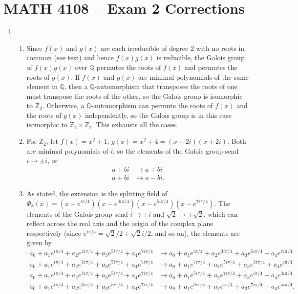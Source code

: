 \documentclass[12pt]{article}
\begin{document}
\section*{MATH 4108 -- Exam 2 Corrections}
\begin{enumerate}
    \item
        \begin{enumerate}
            \item
                Since $f(x)$ and $g(x)$ are each irreducible of degree 2 with no roots in common (see test) and hence $f(x) g(x)$ is reducible, the Galois group of $f(x) g(x)$ over $\mathbb{Q}$ permutes the roots of $f(x)$ and permutes the roots of $g(x)$. If $f(x)$ and $g(x)$ are minimal polynomials of the same element in $\mathbb{Q}$, then a $\mathbb{Q}$-automorphism that transposes the roots of one must transpose the roots of the other, so the Galois group is isomorphic to $\mathbb{Z}_2$. Otherwise, a $\mathbb{Q}$-automorphism can permute the roots of $f(x)$ and the roots of $g(x)$ independently, so the Galois group is in this case isomorphic to $\mathbb{Z}_2 \times \mathbb{Z}_2$. This exhausts all the cases.
            \item
                For $\mathbb{Z}_2$, let $f(x) = x^2 + 1$, $g(x) = x^2 + 4 = (x - 2i)(x + 2i)$. Both are minimal polynomials of $i$, so the elements of the Galois group send $i \to \pm i$, or
                \begin{align*}
                    a + bi &\mapsto a + bi \\
                    a + bi &\mapsto a - bi.
                \end{align*}
            \item
                As stated, the extension is the splitting field of $\Phi_8(x) = (x - e^{i\pi/4})(x - e^{3i\pi/4})(x - e^{5i\pi/4})(x - e^{7i\pi/4})$. The elements of the Galois group send $i \to \pm i$ and $\sqrt{2} \to \pm \sqrt{2}$, which can reflect across the real axis and the origin of the complex plane respectively (since $e^{i\pi/4} = \sqrt{2}/2 + \sqrt{2}i/2$, and so on), the elements are given by
                \begin{align*}
                    a_0 + a_1e^{i\pi/4} + a_2e^{3i\pi/4} + a_3e^{5i\pi/4} + a_4e^{7i\pi/4} &\mapsto a_0 + a_1e^{i\pi/4} + a_2e^{3i\pi/4} + a_3e^{5i\pi/4} + a_4e^{7i\pi/4} \\
                    a_0 + a_1e^{i\pi/4} + a_2e^{3i\pi/4} + a_3e^{5i\pi/4} + a_4e^{7i\pi/4} &\mapsto a_0 + a_1e^{7i\pi/4} + a_2e^{5i\pi/4} + a_3e^{3i\pi/4} + a_4e^{i\pi/4} \\
                    a_0 + a_1e^{i\pi/4} + a_2e^{3i\pi/4} + a_3e^{5i\pi/4} + a_4e^{7i\pi/4} &\mapsto a_0 + a_1e^{5i\pi/4} + a_2e^{7i\pi/4} + a_3e^{i\pi/4} + a_4e^{3i\pi/4} \\
                    a_0 + a_1e^{i\pi/4} + a_2e^{3i\pi/4} + a_3e^{5i\pi/4} + a_4e^{7i\pi/4} &\mapsto a_0 + a_1e^{3i\pi/4} + a_2e^{i\pi/4} + a_3e^{7i\pi/4} + a_4e^{5i\pi/4}.
                \end{align*}
        \end{enumerate}


\end{enumerate}
\end{document}
